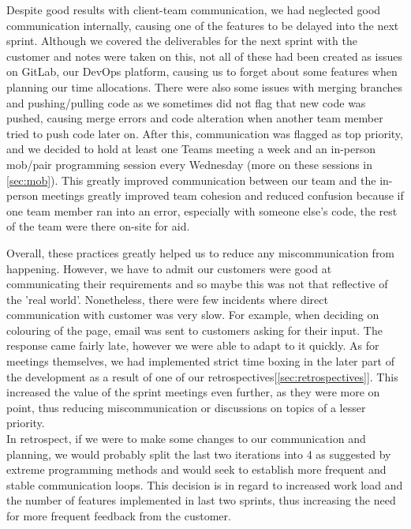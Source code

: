 \documentclass{l3proj}
\begin{document}
        \newline
        \newline
        Despite good results with client-team communication, we had neglected good communication internally, causing one of the features to be delayed into the next sprint. Although we covered the deliverables for the next sprint with the customer and notes were taken on this, not all of these had been created as issues on GitLab, our DevOps platform, causing us to forget about some features when planning our time allocations. There were also some issues with merging branches and pushing/pulling code as we sometimes did not flag that new code was pushed, causing merge errors and code alteration when another team member tried to push code later on. After this, communication was flagged as top priority, and we decided to hold at least one Teams meeting a week and an in-person mob/pair programming session every Wednesday (more on these sessions in \ref{sec:mob}). This greatly improved communication between our team and the in-person meetings greatly improved team cohesion and reduced confusion because if one team member ran into an error, especially with someone else's code, the rest of the team were there on-site for aid.
        
        \newline
        \newline
        Overall, these practices greatly helped us to reduce any miscommunication from happening. However, we have to admit  our customers were good at communicating their requirements and so maybe this was not that reflective of the 'real world'. Nonetheless, there were few incidents where direct communication with customer was very slow. For example, when deciding on colouring of the page, email was sent to customers asking for their input. The response came fairly late, however we were able to adapt to it quickly. As for meetings themselves, we had implemented strict time boxing in the later part of the development as a result of one of our retrospectives[\ref{sec:retrospectives}]. This increased the value of the sprint meetings even further, as they were more on point, thus reducing miscommunication or discussions on topics of a lesser priority.\\
        In retrospect, if we were to make some changes to our communication and planning, we would probably split the last two iterations into 4 as suggested by extreme programming methods \cite{ep} and would seek to establish more frequent and stable communication loops. This decision is in regard to increased work load and the number of features implemented in last two sprints, thus increasing the need for more frequent feedback from the customer.
        
\end{document}
